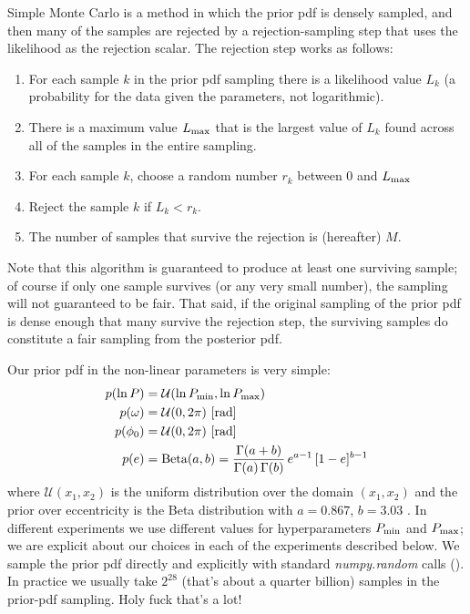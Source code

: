 \documentclass[12pt, preprint]{aastex6}
\newcommand{\project}[1]{\textsl{#1}}
\begin{document}
Simple Monte Carlo is a method in which the prior pdf is densely
sampled, and then many of the samples are rejected by a
rejection-sampling step that uses the likelihood as the rejection
scalar.
The rejection step works as follows:
\begin{enumerate}
\item For each sample $k$ in the prior pdf sampling there is a
  likelihood value $L_k$ (a probability for the data given the
  parameters, not logarithmic).
\item There is a maximum value $L_{\rm max}$ that is the largest value of
  $L_k$ found across all of the samples in the entire sampling.
\item For each sample $k$, choose a random number $r_k$ between 0 and
  $L_{\rm max}$
\item Reject the sample $k$ if $L_k < r_k$.
\item The number of samples that survive the rejection is (hereafter) $M$.
\end{enumerate}
Note that this algorithm is guaranteed to produce at least one
surviving sample; of course if only one sample survives (or any very
small number), the sampling will not guaranteed to be fair.
That said, if the original sampling of the prior pdf is dense enough
that many survive the rejection step, the surviving samples do
constitute a fair sampling from the posterior pdf.

Our prior pdf in the non-linear parameters is very simple:
\begin{align}
    p(\ln P) &= \mathcal{U}(\ln P_{\rm min}, \ln P_{\rm max})\\
    p(\omega) &= \mathcal{U}(0, 2\pi) ~ [{\rm rad}]\\
    p(\phi_0) &= \mathcal{U}(0, 2\pi) ~ [{\rm rad}]\\
    p(e) &= {\rm Beta}(a, b) = \frac{\Gamma(a+b)}{\Gamma(a) \, \Gamma(b)} \, e^{a-1} \, [1 - e]^{b-1}
\end{align}
where $\mathcal{U}(x_1, x_2)$ is the uniform distribution over the
domain $(x_1, x_2)$ and the prior over eccentricity is the Beta
distribution with $a=0.867$, $b=3.03$ \citep{Kipping:2013}.
In different experiments we use different values for hyperparameters
$P_{\rm min}$ and $P_{\rm max}$; we are explicit about our choices in
each of the experiments described below.
We sample the prior pdf directly and explicitly with standard
\project{numpy.random} calls (\citealt{Van-der-Walt:2011}).
In practice we usually take $2^{28}$ (that's about a quarter billion)
samples in the prior-pdf sampling. Holy fuck that's a lot!
\end{document}
